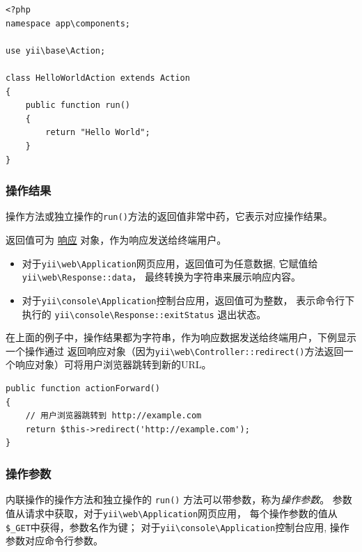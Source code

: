 \lstset{language=php}\begin{lstlisting}
<?php
namespace app\components;

use yii\base\Action;

class HelloWorldAction extends Action
{
    public function run()
    {
        return "Hello World";
    }
}
\end{lstlisting}
\subsubsection{操作结果 \label{structure-controllers.md::action-results}}
操作方法或独立操作的\lstinline|run()|方法的返回值非常中药，它表示对应操作结果。

返回值可为 \hyperref[runtime-responses.md]{响应} 对象，作为响应发送给终端用户。

\begin{itemize}
\item 对于\texttt{yii{\allowbreak{}\textbackslash}web{\allowbreak{}\textbackslash}Application}网页应用，返回值可为任意数据, 它赋值给\texttt{yii{\allowbreak{}\textbackslash}web{\allowbreak{}\textbackslash}Response\allowbreak{}::\allowbreak{}data}，
最终转换为字符串来展示响应内容。
\item 对于\texttt{yii{\allowbreak{}\textbackslash}console{\allowbreak{}\textbackslash}Application}控制台应用，返回值可为整数，
表示命令行下执行的 \texttt{yii{\allowbreak{}\textbackslash}console{\allowbreak{}\textbackslash}Response\allowbreak{}::\allowbreak{}exitStatus} 退出状态。
\end{itemize}
在上面的例子中，操作结果都为字符串，作为响应数据发送给终端用户，下例显示一个操作通过
返回响应对象（因为\texttt{yii{\allowbreak{}\textbackslash}web{\allowbreak{}\textbackslash}Controller\allowbreak{}::\allowbreak{}redirect()}方法返回一个响应对象）可将用户浏览器跳转到新的URL。

\lstset{language=php}\begin{lstlisting}
public function actionForward()
{
    // 用户浏览器跳转到 http://example.com
    return $this->redirect('http://example.com');
}
\end{lstlisting}
\subsubsection{操作参数 \label{structure-controllers.md::action-parameters}}
内联操作的操作方法和独立操作的 \lstinline|run()| 方法可以带参数，称为\textit{操作参数}。
参数值从请求中获取，对于\texttt{yii{\allowbreak{}\textbackslash}web{\allowbreak{}\textbackslash}Application}网页应用，
每个操作参数的值从\lstinline|$_GET|中获得，参数名作为键；
对于\texttt{yii{\allowbreak{}\textbackslash}console{\allowbreak{}\textbackslash}Application}控制台应用, 操作参数对应命令行参数。

